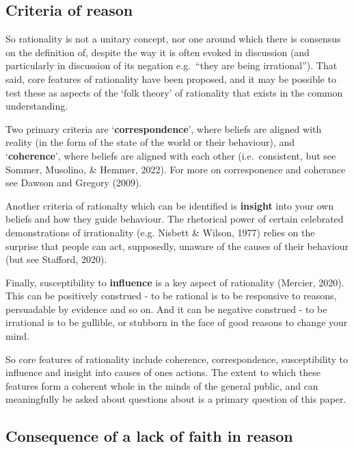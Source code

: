 \documentclass[
  ,jou,floatsintext]{apa6}
\begin{document}
\hypertarget{criteria-of-reason}{%
\subsection{Criteria of reason}\label{criteria-of-reason}}

So rationality is not a unitary concept, nor one around which there is consensus on the definition of, despite the way it is often evoked in discussion (and particularly in discussion of its negation e.g.~``they are being irrational''). That said, core features of rationality have been proposed, and it may be possible to test these as aspects of the `folk theory' of rationality that exists in the common understanding.

Two primary criteria are `\textbf{correspondence}', where beliefs are aligned with reality (in the form of the state of the world or their behaviour), and `\textbf{coherence}', where beliefs are aligned with each other (i.e.~consistent, but see Sommer, Musolino, \& Hemmer, 2022). For more on corresponence and coherance see Dawson and Gregory (2009).

Another criteria of rationalty which can be identified is \textbf{insight} into your own beliefs and how they guide behaviour. The rhetorical power of certain celebrated demonstrations of irrationality (e.g. Nisbett \& Wilson, 1977) relies on the surprise that people can act, supposedly, unaware of the causes of their behaviour (but see Stafford, 2020).

Finally, susceptibility to \textbf{influence} is a key aspect of rationality (Mercier, 2020). This can be positively construed - to be rational is to be responsive to reasons, persuadable by evidence and so on. And it can be negative construed - to be irrational is to be gullible, or stubborn in the face of good reasons to change your mind.

So core features of rationality include coherence, correspondence, susceptibility to influence and insight into causes of ones actions. The extent to which these features form a coherent whole in the minds of the general public, and can meaningfully be asked about questions about is a primary question of this paper.

\hypertarget{consequence-of-a-lack-of-faith-in-reason}{%
\subsection{Consequence of a lack of faith in reason}\label{consequence-of-a-lack-of-faith-in-reason}}
\end{document}
